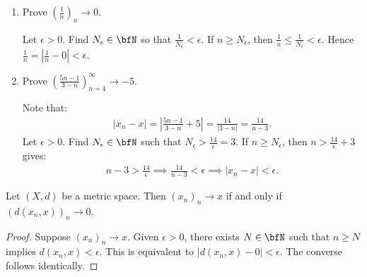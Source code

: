     \begin{example}
        \phantom{a}
        \begin{enumerate}[label = (\arabic*)]
            \item Prove $\left(\frac{1}{n}\right)_n \rightarrow 0$.
                \begin{solution}
                    Let $\epsilon > 0$. Find $N_\epsilon \in \bfN$ so that $\frac{1}{N_\epsilon} < \epsilon$. If $n \geq N_\epsilon$, then $\frac{1}{n} \leq \frac{1}{N_\epsilon} < \epsilon$. Hence $\frac{1}{n} = \left|\frac{1}{n} - 0\right| < \epsilon$.
                \end{solution}
            
            \item Prove $\left(\frac{5n-1}{3-n}\right)_{n=4}^\infty \rightarrow -5$.
                \begin{solution}
                    Note that:
                        \begin{equation*}
                        \begin{split}
                            |x_n - x| = \left|\frac{5n-1}{3-n}  + 5\right| = \frac{14}{|3-n|} = \frac{14}{n-3}.
                        \end{split}
                        \end{equation*}
                    Let $\epsilon > 0$. Find $N_\epsilon \in \bfN$ such that $N_\epsilon > \frac{14}{\epsilon} = 3$. If $n \geq N_\epsilon$, then $n > \frac{14}{\epsilon} + 3$ gives:
                        \begin{equation*}
                        \begin{split}
                            n-3 > \frac{14}{\epsilon} \implies \frac{14}{n-3} < \epsilon \implies |x_n - x| < \epsilon.
                        \end{split}
                        \end{equation*}
                \end{solution}
        \end{enumerate}
    \end{example}

    \begin{proposition}
        Let $(X,d)$ be a metric space. Then $(x_n)_n \rightarrow x$ if and only if $(d(x_n,x))_n \rightarrow 0$.
    \end{proposition}
        \begin{proof}
            Suppose $(x_n)_n \rightarrow x$. Given $\epsilon > 0$, there exists $N \in \bfN$ such that $n \geq N$ implies $d(x_n,x) < \epsilon$. This is equivalent to $|d(x_n,x) - 0| < \epsilon$. The converse follows identically.
        \end{proof}

